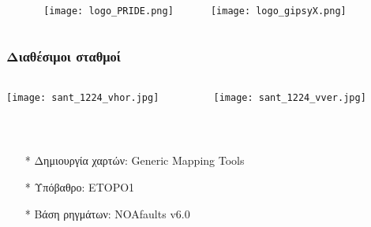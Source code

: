 \begin{frame}
\begin{columns}[T]
\begin{column}{.1\textwidth}
    \end{column}
    \begin{column}{.2\textwidth}
      \begin{center}
        \texttt{[image: logo\_PRIDE.png]}
      \end{center}      
    \end{column}
    \begin{column}{.2\textwidth}
      \begin{center}
        \texttt{[image: logo\_gipsyX.png]}
      \end{center}      
    \end{column}
    \begin{column}{.5\textwidth}
      \begin{center}

      \end{center}      
    \end{column}    
    
  \end{columns}
\end{frame}
\note{}

\begin{frame}
  \frametitle{Διαθέσιμοι σταθμοί}
  \framesubtitle{}
  \label{}
  \vskip-1cm
  \begin{columns}[T]
    \begin{column}{.5\textwidth}
      \begin{center}
        \texttt{[image: sant\_1224\_vhor.jpg]}
      \end{center}  
    \end{column}
    \begin{column}{.5\textwidth}
      \begin{center}
        \texttt{[image: sant\_1224\_vver.jpg]}
      \end{center}       
    \end{column}
  \end{columns}
~\\[1em]   
  \begin{tiny}
  \begin{itemize}\setlength\itemsep{.1em}
    \item[*] Δημιουργία χαρτών: Generic Mapping Tools \citep{gmt}
    \item[*] Υπόβαθρο: ETOPO1 \citep{etopo1}
    \item[*] Βάση ρηγμάτων: NOAfaults v6.0 \citep{noafaults}
  \end{itemize}
  \end{tiny}  
 
\end{frame}
\note{}

